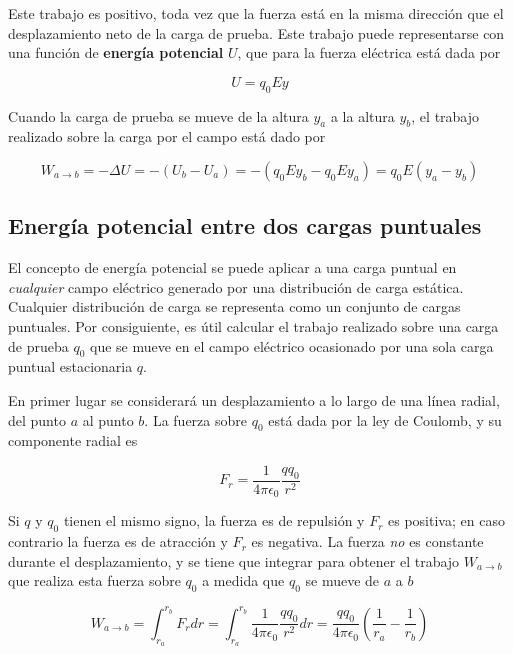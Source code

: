 Este trabajo es positivo, toda vez que la fuerza está en la misma dirección que el desplazamiento neto de la carga de prueba. Este trabajo puede representarse con una función de \textbf{energía potencial} $U$, que para la fuerza eléctrica está dada por

\begin{equation}\label{23.5}
U=q_0Ey
\end{equation}

Cuando la carga de prueba se mueve de la altura $y_a$ a la altura $y_b$, el trabajo realizado sobre la carga por el campo está dado por

\begin{equation}\label{23.6}
W_{a\to b}=-\Delta U=-(U_b-U_a)=-(q_0Ey_b-q_0Ey_a)=q_0E(y_a-y_b)
\end{equation}

\subsection{Energía potencial entre dos cargas puntuales}
El concepto de energía potencial se puede aplicar a una carga puntual en \textit{cualquier} campo eléctrico generado por una distribución de carga estática. 
Cualquier distribución de carga se representa como un conjunto de cargas puntuales. Por consiguiente, es útil calcular el trabajo realizado sobre una carga de prueba $q_0$ que se mueve en el campo eléctrico ocasionado por una sola carga puntual estacionaria $q$.

En primer lugar se considerará un desplazamiento a lo largo de una línea radial, del punto $a$ al punto $b$. La fuerza sobre $q_0$ está dada por la ley de Coulomb, y su componente radial es

\begin{equation}\label{23.7}
F_r=\frac{1}{4\pi\epsilon_0}\frac{qq_0}{r^2}
\end{equation}

Si $q$ y $q_0$ tienen el mismo signo, la fuerza es de repulsión y $F_r$ es positiva; en caso contrario la fuerza es de atracción y $F_r$ es negativa. La fuerza \textit{no} es constante durante el desplazamiento, y se tiene que integrar para obtener el trabajo $W_{a\to b}$ que realiza esta fuerza sobre $q_0$ a medida que $q_0$ se mueve de $a$ a $b$

\begin{equation}\label{23.8}
W_{a\to b}=\int_{r_a}^{r_b}F_rdr=\int_{r_a}^{r_b}\frac{1}{4\pi\epsilon_0}\frac{qq_0}{r^2}dr=\frac{qq_0}{4\pi\epsilon_0}\left(\frac{1}{r_a}-\frac{1}{r_b}\right)
\end{equation}

